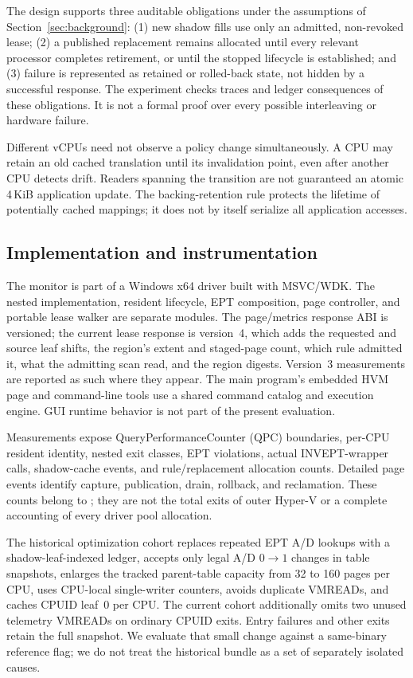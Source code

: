 The design supports three auditable obligations under the assumptions of
Section~\ref{sec:background}: (1) new shadow fills use only an admitted,
non-revoked lease; (2) a published replacement remains allocated until every
relevant processor completes retirement, or until the stopped lifecycle is
established; and (3) failure is represented as retained or rolled-back state,
not hidden by a successful response. The experiment checks traces and ledger
consequences of these obligations. It is not a formal proof over every possible
interleaving or hardware failure.

Different vCPUs need not observe a policy change simultaneously. A CPU may
retain an old cached translation until its invalidation point, even after
another CPU detects drift. Readers spanning the transition are not guaranteed
an atomic 4\,KiB application update. The backing-retention rule protects the
lifetime of potentially cached mappings; it does not by itself serialize all
application accesses.

\subsection{Implementation and instrumentation}
The monitor is part of a Windows x64 driver built with MSVC/WDK. The nested
implementation, resident lifecycle, EPT composition, page controller, and
portable lease walker are separate modules. The page/metrics response ABI is
versioned; the current lease response is version~4, which adds the requested and
source leaf shifts, the region's extent and staged-page count, which rule
admitted it, what the admitting scan read, and the region digests. Version~3
measurements are reported as such where they appear. The main program's embedded
HVM page and command-line tools use a shared command catalog and execution
engine. GUI runtime behavior is not part of the present evaluation.

Measurements expose QueryPerformanceCounter (QPC) boundaries, per-CPU resident
identity, nested exit classes, EPT violations, actual INVEPT-wrapper calls,
shadow-cache events, and rule/replacement allocation counts. Detailed page
events identify capture, publication, drain, rollback, and reclamation. These
counts belong to \ks{}; they are not the total exits of outer Hyper-V or a
complete accounting of every driver pool allocation.

The historical optimization cohort replaces repeated EPT A/D lookups with a
shadow-leaf-indexed ledger, accepts only legal A/D $0\to1$ changes in table
snapshots, enlarges the tracked parent-table capacity from 32 to 160 pages per
CPU, uses CPU-local single-writer counters, avoids duplicate VMREADs, and caches
CPUID leaf~0 per CPU. The current cohort additionally omits two unused telemetry
VMREADs on ordinary CPUID exits. Entry failures and other exits retain the full
snapshot. We evaluate that small change against a same-binary reference flag;
we do not treat the historical bundle as a set of separately isolated causes.

